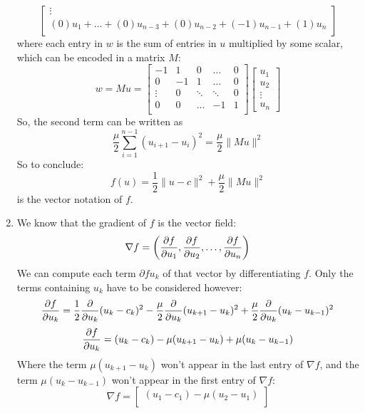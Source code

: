 \documentclass[12pt]{article}
\begin{document}
\begin{enumerate}[label=\alph*)]
\[\begin{bmatrix}
            \vdots \\
            (0)u_1 + \dots + (0)u_{n-3} + (0)u_{n-2} 
            + (-1)u_{n-1} + (1)u_n \\
        \end{bmatrix} \]
        where each entry in $w$ is the sum
        of entries in $u$ multiplied by some scalar,
        which can be encoded in a matrix $M$:
        \[ w = Mu =
        \begin{bmatrix}
            -1 & 1 & 0 & \dots & 0 \\
            0 & -1 & 1 & \dots & 0 \\
            \vdots & 0 & \ddots & \ddots & 0\\
            0 & 0 & \dots & -1 & 1 \\
        \end{bmatrix}
        \begin{bmatrix}
           u_1 \\ u_2 \\ \vdots \\ u_n
        \end{bmatrix} \]
        So, the second term can be written as
         \[ \dfrac{\mu}{2}
        \sum_{i=1}^{n-1}(u_{i+1} - u_i)^2
         = \dfrac{\mu}{2}\| Mu \|^2 \]
        So to conclude:
        \[ f(u) = \dfrac{1}{2}\| u - c \|^2
        + \dfrac{\mu}{2}\| Mu \|^2  \]
        is the vector notation of $f$. \\
        \item
        We know that the gradient of $f$ is 
        the vector field:
        \[ \nabla f = \left( \dfrac{\partial f}{\partial u_1},
        \dfrac{\partial f}{\partial u_2}, \dots, \dfrac{\partial f}{\partial u_n} \right) \]
        We can compute each term $\partial{f}{u_k}$
        of that vector by differentiating $f$.
        Only the terms containing $u_k$
        have to be considered however:
        \[ 
            \dfrac{\partial f}{\partial u_k}
            = \dfrac{1}{2}\dfrac{\partial }{\partial u_k}
            (u_k - c_k)^2
            - \dfrac{\mu}{2}\dfrac{\partial }{\partial u_k}
            (u_{k+1} - u_k)^2
            + \dfrac{\mu}{2}\dfrac{\partial }{\partial u_k}
            (u_{k} - u_{k-1})^2
        \]
        \[ \dfrac{\partial f}{\partial u_k} = (u_k - c_k)
        - \mu(u_{k+1} - u_k) + \mu(u_{k} - u_{k-1}) \]
        Where the term $\mu(u_{k+1} - u_k)$
        won't appear in the last entry of $\nabla f$,
        and the term  $\mu(u_{k} - u_{k-1})$
        won't appear in the first entry of $\nabla f$:
        \[ \nabla f = \begin{bmatrix}
        (u_1 - c_1) - \mu(u_{2} - u_1) \\

\end{bmatrix}\]
\end{enumerate}
\end{document}
